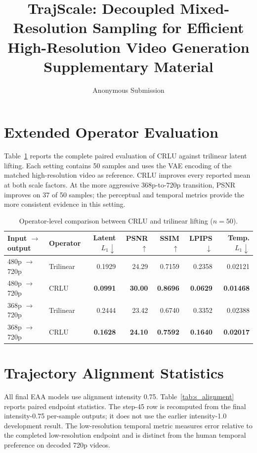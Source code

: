 \documentclass[letterpaper]{article}
\title{TrajScale: Decoupled Mixed-Resolution Sampling for Efficient High-Resolution Video Generation\\Supplementary Material}
\author{Anonymous Submission}
\begin{document}
\maketitle

\section{Extended Operator Evaluation}

Table~\ref{tab:s_operator} reports the complete paired evaluation of CRLU against trilinear latent lifting. Each setting contains 50 samples and uses the VAE encoding of the matched high-resolution video as reference. CRLU improves every reported mean at both scale factors. At the more aggressive 368p-to-720p transition, PSNR improves on 37 of 50 samples; the perceptual and temporal metrics provide the more consistent evidence in this setting.

\begin{table}[t]
\centering
\small
\begin{tabular}{llrrrrr}
\toprule
Input $\rightarrow$ output & Operator & Latent $L_1\downarrow$ & PSNR $\uparrow$ & SSIM $\uparrow$ & LPIPS $\downarrow$ & Temp. $L_1\downarrow$ \\
\midrule
480p $\rightarrow$ 720p & Trilinear & 0.1929 & 24.29 & 0.7159 & 0.2358 & 0.02121 \\
480p $\rightarrow$ 720p & CRLU & \textbf{0.0991} & \textbf{30.00} & \textbf{0.8696} & \textbf{0.0629} & \textbf{0.01468} \\
368p $\rightarrow$ 720p & Trilinear & 0.2444 & 23.42 & 0.6740 & 0.3352 & 0.02388 \\
368p $\rightarrow$ 720p & CRLU & \textbf{0.1628} & \textbf{24.10} & \textbf{0.7592} & \textbf{0.1640} & \textbf{0.02017} \\
\bottomrule
\end{tabular}
\caption{Operator-level comparison between CRLU and trilinear lifting ($n=50$).}
\label{tab:s_operator}
\end{table}

\section{Trajectory Alignment Statistics}

All final EAA models use alignment intensity 0.75. Table~\ref{tab:s_alignment} reports paired endpoint statistics. The step-45 row is recomputed from the final intensity-0.75 per-sample outputs; it does not use the earlier intensity-1.0 development result. The low-resolution temporal metric measures error relative to the completed low-resolution endpoint and is distinct from the human temporal preference on decoded 720p videos.
\end{document}
